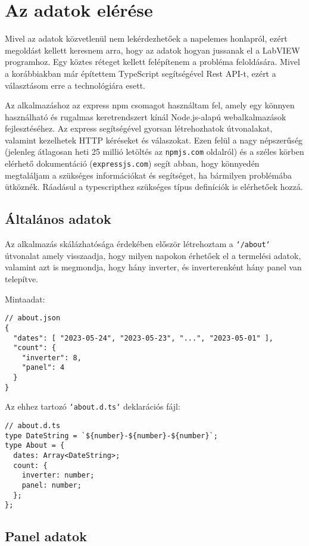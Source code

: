 \chapter{Az adatok elérése}

Mivel az adatok közvetlenül nem lekérdezhetőek a napelemes honlapról, ezért
megoldást kellett keresnem arra, hogy az adatok hogyan jussanak el a LabVIEW
programhoz. Egy köztes réteget kellett felépítenem a probléma feloldására.
Mivel a korábbiakban már építettem TypeScript segítségével Rest API-t,
ezért a választásom erre a technológiára esett.

Az alkalmazáshoz az express npm csomagot használtam fel, amely egy könnyen
használható és rugalmas keretrendszert kínál Node.js-alapú webalkalmazások
fejlesztéséhez. Az express segítségével gyorsan létrehozhatok útvonalakat,
valamint kezelhetek HTTP kéréseket és válaszokat. Ezen felül a nagy népszerűség
(jelenleg átlagosan heti 25 millió letöltés az \texttt{npmjs.com} oldalról) és a
széles körben elérhető dokumentáció (\texttt{expressjs.com})
segít abban, hogy könnyedén megtaláljam a szükséges információkat és segítséget,
ha bármilyen problémába ütköznék. Ráadásul a typescripthez szükséges típus
definíciók is elérhetőek hozzá.

\section{Általános adatok}

Az alkalmazás skálázhatósága érdekében először létrehoztam a \texttt{`/about`}
útvonalat amely visszaadja, hogy milyen napokon érhetőek el a termelési adatok,
valamint azt is megmondja, hogy hány inverter, és inverterenként hány panel
van telepítve.

Mintaadat:

\begin{verbatim}
// about.json
{
  "dates": [ "2023-05-24", "2023-05-23", "...", "2023-05-01" ],
  "count": {
    "inverter": 8,
    "panel": 4
  }
}
\end{verbatim}

Az ehhez tartozó \texttt{`about.d.ts`} deklarációs fájl:

\begin{verbatim}
// about.d.ts
type DateString = `${number}-${number}-${number}`;
type About = {
  dates: Array<DateString>;
  count: {
    inverter: number;
    panel: number;
  };
};
\end{verbatim}

\section{Panel adatok}

